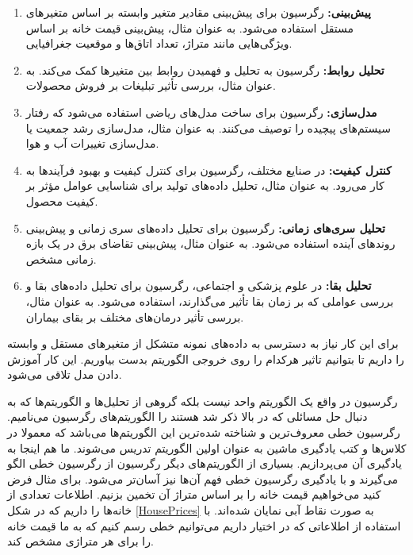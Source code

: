 \documentclass[a4paper, titlepage]{article}
\begin{document}
\begin{enumerate}
    \item \textbf{پیش‌بینی:} رگرسیون برای پیش‌بینی مقادیر متغیر وابسته بر اساس متغیرهای مستقل استفاده می‌شود. به عنوان مثال، پیش‌بینی قیمت خانه بر اساس ویژگی‌هایی مانند متراژ، تعداد اتاق‌ها و موقعیت جغرافیایی.
    \item \textbf{تحلیل روابط:} رگرسیون به تحلیل و فهمیدن روابط بین متغیرها کمک می‌کند. به عنوان مثال، بررسی تأثیر تبلیغات بر فروش محصولات.
    \item \textbf{مدل‌سازی:} رگرسیون برای ساخت مدل‌های ریاضی استفاده می‌شود که رفتار سیستم‌های پیچیده را توصیف می‌کنند. به عنوان مثال، مدل‌سازی رشد جمعیت یا مدل‌سازی تغییرات آب و هوا.
    \item \textbf{کنترل کیفیت:} در صنایع مختلف، رگرسیون برای کنترل کیفیت و بهبود فرآیندها به کار می‌رود. به عنوان مثال، تحلیل داده‌های تولید برای شناسایی عوامل مؤثر بر کیفیت محصول.
    \item \textbf{تحلیل سری‌های زمانی:} رگرسیون برای تحلیل داده‌های سری زمانی و پیش‌بینی روندهای آینده استفاده می‌شود. به عنوان مثال، پیش‌بینی تقاضای برق در یک بازه زمانی مشخص.
    \item \textbf{تحلیل بقا:} در علوم پزشکی و اجتماعی، رگرسیون برای تحلیل داده‌های بقا و بررسی عواملی که بر زمان بقا تأثیر می‌گذارند، استفاده می‌شود. به عنوان مثال، بررسی تأثیر درمان‌های مختلف بر بقای بیماران.
\end{enumerate}

برای این کار نیاز به دسترسی به داده‌های نمونه متشکل از متغیر‌های مستقل و وابسته را داریم تا بتوانیم تاثیر هرکدام را روی خروجی الگوریتم بدست بیاوریم. این کار آموزش دادن مدل تلاقی می‌شود.

رگرسیون در واقع یک الگوریتم واحد نیست بلکه گروهی از تحلیل‌ها و الگوریتم‌ها که به دنبال حل مسائلی که در بالا ذکر شد هستند را الگوریتم‌های رگرسیون می‌نامیم. رگرسیون خطی معروف‌ترین و شناخته شده‌ترین این الگوریتم‌ها می‌باشد که معمولا در کلاس‌ها و کتب یادگیری ماشین به عنوان اولین الگوریتم تدریس می‌شوند. ما هم اینجا به یادگیری آن می‌پردازیم. بسیاری از الگوریتم‌های دیگر رگرسیون از رگرسیون خطی الگو می‌گیرند و با یادگیری رگرسیون خطی فهم آن‌ها نیز آسان‌تر می‌شود.
برای مثال فرض کنید می‌خواهیم قیمت خانه را بر اساس متراژ آن تخمین بزنیم. اطلاعات تعدادی از خانه‌ها را داریم که در شکل \ref{HousePrices} به صورت نقاط آبی نمایان شده‌اند. با استفاده از اطلاعاتی که در اختیار داریم می‌توانیم خطی رسم کنیم که به ما قیمت خانه را برای هر متراژی مشخص کند.
\end{document}
